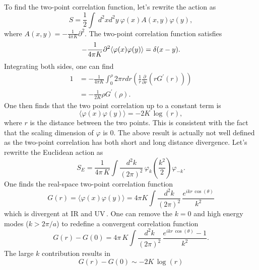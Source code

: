 \documentclass[submission, PhysLectNotes]{SciPost}
\begin{document}
To find the two-point correlation function, let's rewrite the action as
\begin{equation}
    S = \frac{1}{2}\int \ d^2xd^2y \ \varphi(x) A(x,y) \varphi(y),
\end{equation}
where $A(x,y) = -\frac{1}{4\pi K}\partial^2$. The two-point correlation function satisfies
\begin{equation}
    -\frac{1}{4\pi K}\partial^2 \langle \varphi(x) \varphi(y) \rangle = \delta(x-y). \\
\end{equation}
Integrating both sides, one can find
\begin{equation}
	\begin{aligned}
		1 &= -\frac{1}{4\pi K} \int_0^\rho 2\pi r dr \left( \frac{1}{r} \frac{\partial}{\partial r} \left( r G^{\prime}(r) \right)\right)\\
		&= -\frac{1}{2 K} \rho G^\prime (\rho).
	\end{aligned}
\end{equation}
One then finds that the two point correlation up to a constant term is
\begin{equation}
    \langle \varphi(x) \varphi(y) \rangle = -2 K\,\mathrm{\log} (r),
\end{equation}
where $r$ is the distance between the two points. This is consistent with the fact that the scaling dimension of $\varphi$ is 0. The above result is actually not well defined as the two-point correlation has both short and long distance divergence. Let's rewritte the Euclidean action as 
\begin{equation}
	S_E = \frac{1}{4\pi\,K} \int {\frac{d^2k}{{(2\pi)}^2}} \, \varphi_k \left(\frac{k^2}{2}\right)\varphi_{-k}.
\end{equation} 
One finds the real-space two-point correlation function
\begin{equation}
	G(r) = \langle \varphi(x) \varphi(y) \rangle = 4\pi K \int \frac{d^2k}{{(2\pi)}^2}\, \frac{e^{ikr\,\cos(\theta)}}{k^2}
\end{equation}
which is divergent at IR and UV\,. One can remove the $k=0$ and high energy modes ($k>2\pi/a$) to redefine a convergent correlation function 
\begin{equation}
	G(r) - G(0) = 4\pi\,K \int \frac{d^2k}{{(2\pi)}^2}\, \frac{e^{ikr\,\cos(\theta)}-1}{k^2}.
\end{equation}
The large $k$ contribution results in
\begin{equation}
	G(r) - G(0) \sim -2 K\,\log(r)
\end{equation}
\end{document}
